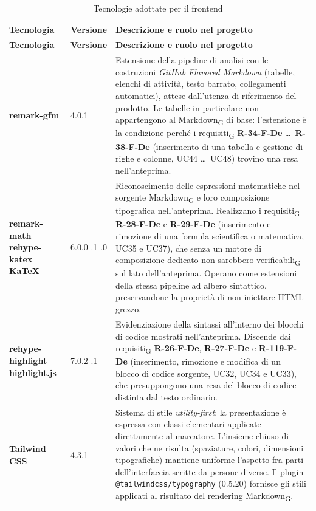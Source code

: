 \documentclass[a4paper, 10pt]{article}
\newenvironment{tabellatec}[2]{%
  \begingroup
  \small
  \setlength{\tabcolsep}{4pt}
  \begin{longtable}{|p{2.8cm}|p{1.5cm}|p{9.2cm}|}
    \caption{#1}\label{#2}\\
    \hline
    \textbf{Tecnologia} & \textbf{Versione} & \textbf{Descrizione e ruolo nel progetto} \\
    \hline
    \endfirsthead
    \hline
    \textbf{Tecnologia} & \textbf{Versione} & \textbf{Descrizione e ruolo nel progetto} \\
    \hline
    \endhead
}{%
  \end{longtable}
  \endgroup
}
\begin{document}
\begin{tabellatec}{Tecnologie adottate per il frontend}{tab:tec-frontend}
    \textbf{remark-gfm} & 4.0.1 & Estensione della pipeline di analisi con le costruzioni \textit{GitHub Flavored Markdown} (tabelle, elenchi di attività, testo barrato, collegamenti automatici), attese dall'utenza di riferimento del prodotto. Le tabelle in particolare non appartengono al Markdown\textsubscript{G} di base: l'estensione è la condizione perché i requisiti\textsubscript{G} \textbf{R-34-F-De} \dots\ \textbf{R-38-F-De} (inserimento di una tabella e gestione di righe e colonne, UC44 \dots\ UC48) trovino una resa nell'anteprima. \\ \hline

    \textbf{remark-math \newline rehype-katex \newline KaTeX} & 6.0.0 \newline 7.0.1 \newline 0.17.0 & Riconoscimento delle espressioni matematiche nel sorgente Markdown\textsubscript{G} e loro composizione tipografica nell'anteprima. Realizzano i requisiti\textsubscript{G} \textbf{R-28-F-De} e \textbf{R-29-F-De} (inserimento e rimozione di una formula scientifica o matematica, UC35 e UC37), che senza un motore di composizione dedicato non sarebbero verificabili\textsubscript{G} sul lato dell'anteprima. Operano come estensioni della stessa pipeline ad albero sintattico, preservandone la proprietà di non iniettare HTML grezzo. \\ \hline

    \textbf{rehype-highlight \newline highlight.js} & 7.0.2 \newline 11.11.1 & Evidenziazione della sintassi all'interno dei blocchi di codice mostrati nell'anteprima. Discende dai requisiti\textsubscript{G} \textbf{R-26-F-De}, \textbf{R-27-F-De} e \textbf{R-119-F-De} (inserimento, rimozione e modifica di un blocco di codice sorgente, UC32, UC34 e UC33), che presuppongono una resa del blocco di codice distinta dal testo ordinario. \\ \hline

    \textbf{Tailwind CSS} & 4.3.1 & Sistema di stile \textit{utility-first}: la presentazione è espressa con classi elementari applicate direttamente al marcatore. L'insieme chiuso di valori che ne risulta (spaziature, colori, dimensioni tipografiche) mantiene uniforme l'aspetto fra parti dell'interfaccia scritte da persone diverse. Il plugin \texttt{@tailwindcss/typo\-graphy} (0.5.20) fornisce gli stili applicati al risultato del rendering Markdown\textsubscript{G}. \\ \hline


\end{tabellatec}
\end{document}
